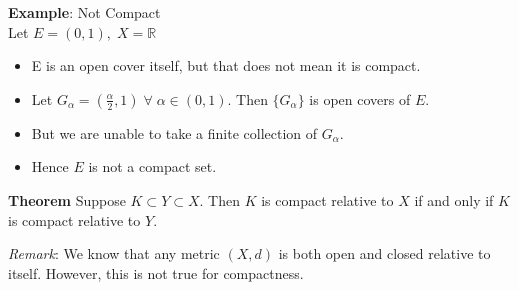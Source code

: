 \documentclass[12pt]{article}
\begin{document}
\vspace{1.5\baselineskip}
\begin{block}{\bf Example}: Not Compact\\
Let $E = (0,1),\; X=\mathbb{R}$
\begin{itemize}
    \item E is an open cover itself, but that does not mean it is compact.
    \item Let $G_\alpha = (\frac{\alpha}{2},1)\;\forall\;\alpha\in(0,1)$. Then $\{G_\alpha\}$ is open covers of $E$.
    \item But we are unable to take a finite collection of $G_\alpha$.
    \item Hence $E$ is not a compact set.
\end{itemize}
\end{block}


\newpage
\begin{block}{\bf Theorem} 
Suppose $K\subset Y\subset X$. Then $K$ is compact relative to $X$ if and only if $K$ is compact relative to $Y$.

\vspace{1.0\baselineskip}
{\sl Remark}: We know that any metric $(X,d)$ is both open and closed relative to itself. However, this is not true for compactness.
\end{block}
\end{document}
